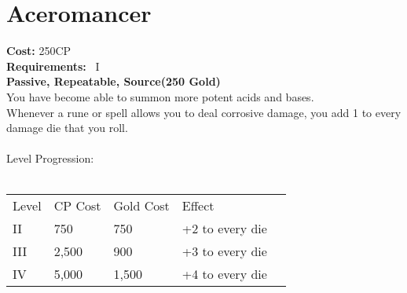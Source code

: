 \section{Aceromancer}\label{perk:aceromancer}
\textbf{Cost:} 250CP\\
\textbf{Requirements:}~ I\\
\textbf{Passive, Repeatable, Source(250 Gold)}\\
You have become able to summon more potent acids and bases.\\
Whenever a rune or spell allows you to deal corrosive damage, you add 1 to every damage die that you roll.\\
\\
Level Progression:\\
\\
\begin{tabular}{l | l | l | l | l}
    Level & CP Cost & Gold Cost &  Effect\\
    II & 750 & 750 & +2 to every die\\
    III & 2,500 & 900 & +3 to every die\\
    IV & 5,000 & 1,500 & +4 to every die\\
\end{tabular}